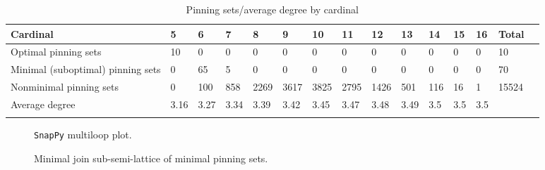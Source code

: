 \documentclass{article}%
\begin{document}
\begin{table}[ht]
	\caption{Pinning sets/average degree by cardinal}
	\centering
	\renewcommand{\arraystretch}{1.5}
	\begin{tabularx}{\textwidth}{lXXXXXXXXXXXXXX}
		\toprule
			Cardinal & 5 & 6 & 7 & 8 & 9 & 10 & 11 & 12 & 13 & 14 & 15 & 16 & Total\\
			\hline
			Optimal pinning sets & 10 & 0 & 0 & 0 & 0 & 0 & 0 & 0 & 0 & 0 & 0 & 0 & 10 \\
			Minimal (suboptimal) pinning sets & 0 & 65 & 5 & 0 & 0 & 0 & 0 & 0 & 0 & 0 & 0 & 0 & 70 \\
			Nonminimal pinning sets & 0 & 100 & 858 & 2269 & 3617 & 3825 & 2795 & 1426 & 501 & 116 & 16 & 1 & 15524 \\
			Average degree & 3.16 & 3.27 & 3.34 & 3.39 & 3.42 & 3.45 & 3.47 & 3.48 & 3.49 & 3.5 & 3.5 & 3.5 &  \\
		\bottomrule \\ 
	\end{tabularx}
\end{table}

\begin{multicols}{2}
\begin{figure}[H]
\centering

\caption{\texttt{SnapPy} multiloop plot.}
\label{fig:tex/img/[[22, 7, 1, 8], [8, 23, 9, 28], [21, 27, 22, 28], [6, 13, 7, 14], [1, 24, 2, 23], [9, 17, 10, 16], [20, 15, 21, 16], [26, 14, 27, 15], [5, 25, 6, 26], [12, 24, 13, 25], [2, 18, 3, 17], [10, 3, 11, 4],.svg}
\end{figure}
\columnbreak

\begin{figure}[H]
\centering
\scalebox{0.8}{}
\caption{Minimal join sub-semi-lattice of minimal pinning sets.}
\label{fig:tex/img/[[22, 7, 1, 8], [8, 23, 9, 28], [21, 27, 22, 28], [6, 13, 7, 14], [1, 24, 2, 23], [9, 17, 10, 16], [20, 15, 21, 16], [26, 14, 27, 15], [5, 25, 6, 26], [12, 24, 13, 25], [2, 18, 3, 17], [10, 3, 11, 4],.pgf}
\end{figure}
\end{multicols}
\end{document}
